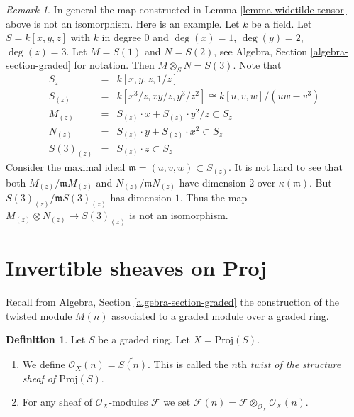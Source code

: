 \documentclass{stacks-project}
\theoremstyle{plain}
\theoremstyle{definition}
\newtheorem{definition}[subsection]{Definition}
\theoremstyle{remark}
\newtheorem{remark}[subsection]{Remark}
\numberwithin{equation}{subsection}
\begin{document}
\begin{remark}
\label{remark-not-isomorphism}
In general the map constructed in Lemma \ref{lemma-widetilde-tensor}
above is not an isomorphism. Here is an example. Let $k$
be a field. Let $S = k[x, y, z]$ with $k$ in degree $0$ and
$\deg(x) = 1$, $\deg(y) = 2$, $\deg(z) = 3$.
Let $M = S(1)$ and $N = S(2)$, see
Algebra, Section \ref{algebra-section-graded}
for notation. Then $M \otimes_S N = S(3)$.
Note that
\begin{eqnarray*}
S_z
& = &
k[x, y, z, 1/z] \\
S_{(z)}
& = &
k[x^3/z, xy/z, y^3/z^2]
\cong
k[u, v, w]/(uw - v^3) \\
M_{(z)} & = & S_{(z)} \cdot x + S_{(z)} \cdot y^2/z \subset S_z \\
N_{(z)} & = & S_{(z)} \cdot y + S_{(z)} \cdot x^2 \subset S_z \\
S(3)_{(z)} & = & S_{(z)} \cdot z \subset S_z
\end{eqnarray*}
Consider the maximal ideal $\mathfrak m = (u, v, w) \subset S_{(z)}$.
It is not hard to see that both $M_{(z)}/\mathfrak mM_{(z)}$
and $N_{(z)}/\mathfrak mN_{(z)}$ have dimension $2$ over
$\kappa(\mathfrak m)$. But
$S(3)_{(z)}/\mathfrak mS(3)_{(z)}$ has dimension $1$.
Thus the map $M_{(z)} \otimes N_{(z)} \to S(3)_{(z)}$ is not
an isomorphism.
\end{remark}









\section{Invertible sheaves on Proj}
\label{section-invertible-on-proj}

\noindent
Recall from Algebra, Section \ref{algebra-section-graded}
the construction of the twisted module $M(n)$ associated
to a graded module over a graded ring.

\begin{definition}
\label{definition-twist}
Let $S$ be a graded ring. Let $X = \text{Proj}(S)$.
\begin{enumerate}
\item We define $\mathcal{O}_X(n) = \widetilde{S(n)}$.
This is called the $n$th
{\it twist of the structure sheaf of $\text{Proj}(S)$}.
\item For any sheaf of $\mathcal{O}_X$-modules $\mathcal{F}$ we set
$\mathcal{F}(n) = \mathcal{F} \otimes_{\mathcal{O}_X} \mathcal{O}_X(n)$.
\end{enumerate}
\end{definition}
\end{document}
